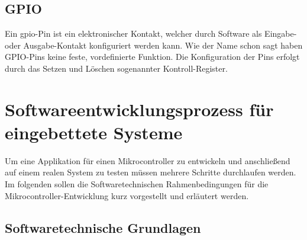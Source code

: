 \subsection{GPIO}

Ein \ac{gpio}-Pin ist ein elektronischer Kontakt, welcher durch Software als
Eingabe- oder Ausgabe-Kontakt konfiguriert werden
kann\cite{Digitec_WGehrke_MWinzker}.
Wie der Name schon sagt haben GPIO-Pins keine feste, vordefinierte Funktion.
Die Konfiguration der Pins erfolgt durch das Setzen und Löschen sogenannter
Kontroll-Register.


\section{Softwareentwicklungsprozess für eingebettete Systeme}

Um eine Applikation für einen Mikrocontroller zu entwickeln und anschließend
auf einem realen System zu testen müssen mehrere Schritte durchlaufen werden.
Im folgenden sollen die Softwaretechnischen Rahmenbedingungen für die
Mikrocontroller-Entwicklung kurz vorgestellt und erläutert werden.

\subsection{Softwaretechnische Grundlagen}

